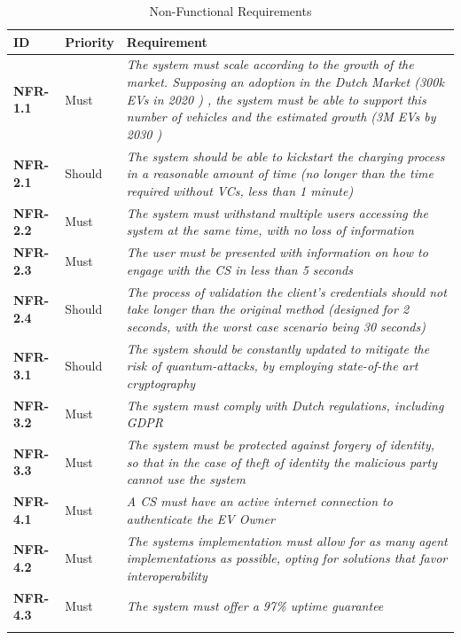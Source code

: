 \begin{longtable}{|p{}p{}p{}|}
        \hline
        \textbf{ID} & \textbf{Priority} & \textbf{Requirement}\\
        \hline
        \hline
       \textbf{NFR-1.1} & Must & \textit{The system must scale according to the growth of the market. Supposing an adoption in the Dutch Market (300k EVs in 2020 \protect\footnotemark)     \footnotetext{\url{https://www.rvo.nl/sites/default/files/2020/11/Statistics\%20Electric\%20Vehicles\%20and\%20Charging\%20in\%20The\%20Netherlands\%20up\%20to\%20and\%20including\%20October\%202020\%20-\%202.pdf}}, the system must be able to support this number of vehicles and the estimated growth (3M EVs by 2030 \protect\footnotemark) 
       \footnotetext{\url{nklnederland.com/news/sparkcity-3-million-evs-by-2030-2/}}}\\
       \hline
       \textbf{NFR-2.1} & Should & \textit{The system should be able to kickstart the charging process in a reasonable amount of time (no longer than the time required without VCs, less than 1 minute)}\\
       \textbf{NFR-2.2} & Must & \textit{The system must withstand multiple users accessing the system at the same time, with no loss of information}\\
       \textbf{NFR-2.3} & Must & \textit{The user must be presented with information on how to engage with the CS in less than 5 seconds}\\
       \textbf{NFR-2.4} & Should & \textit{The process of validation the client's credentials should not take longer than the original method (designed for 2 seconds, with the worst case scenario being 30 seconds)}\\
       \hline
       \textbf{NFR-3.1} & Should & \textit{The system should be constantly updated to mitigate the risk of quantum-attacks, by employing state-of-the art cryptography}\\
      \textbf{NFR-3.2} & Must & \textit{The system must comply with Dutch regulations, including \acrfull{GDPR}}\\
      \textbf{NFR-3.3} & Must & \textit{The system must be protected against forgery of identity, so that in the case of theft of identity the malicious party cannot use the system}\\
      \hline
      \textbf{NFR-4.1} & Must & \textit{A CS must have an active internet connection to authenticate the EV Owner}\\
      \textbf{NFR-4.2} & Must & \textit{The systems implementation must allow for as many agent implementations as possible, opting for solutions that favor interoperability}\\
      \textbf{NFR-4.3} & Must & \textit{The system must offer a 97\% uptime guarantee \cite{todts_2020}} \\
      \hline
\caption{Non-Functional Requirements}
\label{tab:non-functional_requirements}
\end{longtable}